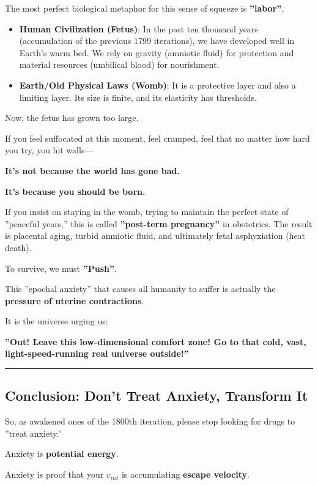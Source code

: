 The most perfect biological metaphor for this sense of squeeze is \textbf{''labor''}.

\begin{itemize}
\item \textbf{Human Civilization (Fetus)}: In the past ten thousand years (accumulation of the previous 1799 iterations), we have developed well in Earth's warm bed. We rely on gravity (amniotic fluid) for protection and material resources (umbilical blood) for nourishment.

\item \textbf{Earth/Old Physical Laws (Womb)}: It is a protective layer and also a limiting layer. Its size is finite, and its elasticity has thresholds.
\end{itemize}

Now, the fetus has grown too large.

If you feel suffocated at this moment, feel cramped, feel that no matter how hard you try, you hit walls---

\textbf{It's not because the world has gone bad.}

\textbf{It's because you should be born.}

If you insist on staying in the womb, trying to maintain the perfect state of ''peaceful years,'' this is called \textbf{''post-term pregnancy''} in obstetrics. The result is placental aging, turbid amniotic fluid, and ultimately fetal asphyxiation (heat death).

To survive, we must \textbf{''Push''}.

This ''epochal anxiety'' that causes all humanity to suffer is actually the \textbf{pressure of uterine contractions}.

It is the universe urging us:

\textbf{''Out! Leave this low-dimensional comfort zone! Go to that cold, vast, light-speed-running real universe outside!''}

\hrule

\subsection{Conclusion: Don't Treat Anxiety, Transform It}

So, as awakened ones of the 1800th iteration, please stop looking for drugs to ''treat anxiety.''

Anxiety is \textbf{potential energy}.

Anxiety is proof that your $v_{int}$ is accumulating \textbf{escape velocity}.

